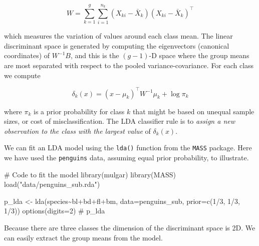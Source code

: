 \documentclass[
  letterpaper,
]{krantz}
\newenvironment{Shaded}{\begin{snugshade}}{\end{snugshade}}
\newcommand{\AttributeTok}[1]{\textcolor[rgb]{0.40,0.45,0.13}{#1}}
\newcommand{\CommentTok}[1]{\textcolor[rgb]{0.37,0.37,0.37}{#1}}
\newcommand{\DecValTok}[1]{\textcolor[rgb]{0.68,0.00,0.00}{#1}}
\newcommand{\FunctionTok}[1]{\textcolor[rgb]{0.28,0.35,0.67}{#1}}
\newcommand{\NormalTok}[1]{\textcolor[rgb]{0.00,0.23,0.31}{#1}}
\newcommand{\OtherTok}[1]{\textcolor[rgb]{0.00,0.23,0.31}{#1}}
\newcommand{\SpecialCharTok}[1]{\textcolor[rgb]{0.37,0.37,0.37}{#1}}
\newcommand{\StringTok}[1]{\textcolor[rgb]{0.13,0.47,0.30}{#1}}
\begin{document}
\[
W =
\sum_{k=1}^g\sum_{i=1}^{n_k}
(X_{ki}-\bar{X}_k)(X_{ki}-\bar{X}_k)^\top
\]

which measures the variation of values around each class mean. The
linear discriminant space is generated by computing the eigenvectors
(canonical coordinates) of \(W^{-1}B\), and this is the \((g-1)\)-D
space where the group means are most separated with respect to the
pooled variance-covariance. For each class we compute

\[
\delta_k(x) = (x-\mu_k)^\top W^{-1}\mu_k + \log \pi_k
\]

where \(\pi_k\) is a prior probability for class \(k\) that might be
based on unequal sample sizes, or cost of misclassification. The LDA
classifier rule is to \emph{assign a new observation to the class with
the largest value} of \(\delta_k(x)\).

We can fit an LDA model using the \texttt{lda()} function from the
\texttt{MASS} package. Here we have used the \texttt{penguins} data,
assuming equal prior probability, to illustrate.

  

\begin{Shaded}
\begin{Highlighting}[]
\CommentTok{\# Code to fit the model}
\FunctionTok{library}\NormalTok{(mulgar)}
\FunctionTok{library}\NormalTok{(MASS)}
\FunctionTok{load}\NormalTok{(}\StringTok{"data/penguins\_sub.rda"}\NormalTok{)}

\NormalTok{p\_lda }\OtherTok{\textless{}{-}} \FunctionTok{lda}\NormalTok{(species}\SpecialCharTok{\textasciitilde{}}\NormalTok{bl}\SpecialCharTok{+}\NormalTok{bd}\SpecialCharTok{+}\NormalTok{fl}\SpecialCharTok{+}\NormalTok{bm, }
             \AttributeTok{data=}\NormalTok{penguins\_sub,}
             \AttributeTok{prior=}\FunctionTok{c}\NormalTok{(}\DecValTok{1}\SpecialCharTok{/}\DecValTok{3}\NormalTok{, }\DecValTok{1}\SpecialCharTok{/}\DecValTok{3}\NormalTok{, }\DecValTok{1}\SpecialCharTok{/}\DecValTok{3}\NormalTok{))}
\FunctionTok{options}\NormalTok{(}\AttributeTok{digits=}\DecValTok{2}\NormalTok{)}
\CommentTok{\# p\_lda}
\end{Highlighting}
\end{Shaded}

Because there are three classes the dimension of the discriminant space
is 2D. We can easily extract the group means from the model.

\begin{Shaded}
\end{Shaded}
\end{document}
